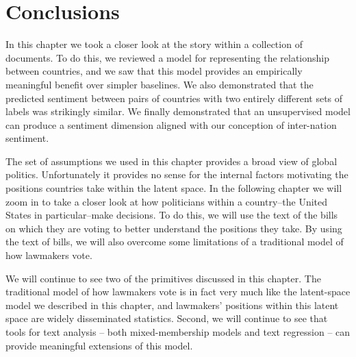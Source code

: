 \section{Conclusions}

In this chapter we took a closer look at the story within a collection
of documents.  To do this, we reviewed a model for representing the
relationship between countries, and we saw that this model provides an
empirically meaningful benefit over simpler baselines.  We also
demonstrated that the predicted sentiment between pairs of countries
with two entirely different sets of labels was strikingly similar.  We
finally demonstrated that an unsupervised model can produce a
sentiment dimension aligned with our conception of inter-nation
sentiment.

The set of assumptions we used in this chapter provides a broad view
of global politics.  Unfortunately it provides no sense for the
internal factors motivating the positions countries take within the
latent space.  In the following chapter we will zoom in to take a
closer look at how politicians within a country--the United States in
particular--make decisions.  To do this, we will use the text of the
bills on which they are voting to better understand the positions they
take.  By using the text of bills, we will also overcome some
limitations of a traditional model of how lawmakers vote.

We will continue to see two of the primitives discussed in this
chapter.  The traditional model of how lawmakers vote is in fact very
much like the latent-space model we described in this chapter, and
lawmakers' positions within this latent space are widely disseminated
statistics. Second, we will continue to see that tools for text
analysis -- both mixed-membership models and text regression -- can
provide meaningful extensions of this model.
